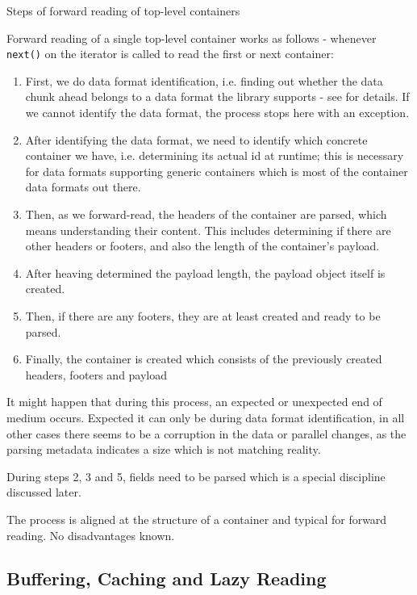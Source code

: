 {%
Steps of forward reading of top-level containers
}
{%
  Forward reading of a single top-level container works as follows - whenever \texttt{next()} on the iterator is called to read the first or next container:
  \begin{enumerate}
  \item First, we do data format identification, i.e. finding out whether the data chunk ahead belongs to a data format the library supports - see  for details. If we cannot identify the data format, the process stops here with an exception.
  \item After identifying the data format, we need to identify which concrete container we have, i.e. determining its actual id at runtime; this is necessary for data formats supporting generic containers which is most of the container data formats out there. 
  \item Then, as we forward-read, the headers of the container are parsed, which means understanding their content. This includes determining if there are other headers or footers, and also the length of the container's payload.
  \item After heaving determined the payload length, the payload object itself is created. 
  \item Then, if there are any footers, they are at least created and ready to be parsed.
  \item Finally, the container is created which consists of the previously created headers, footers and payload
  \end{enumerate}
  It might happen that during this process, an expected or unexpected end of medium occurs. Expected it can only be during data format identification, in all other cases there seems to be a corruption in the data or parallel changes, as the parsing metadata indicates a size which is not matching reality.

  During steps 2, 3 and 5, fields need to be parsed which is a special discipline discussed later.
}
{%
The process is aligned at the structure of a container and typical for forward reading.
}
{%
No disadvantages known.
}

\subsection{Buffering, Caching and Lazy Reading}%
\label{sec:ReadingSteps}%

